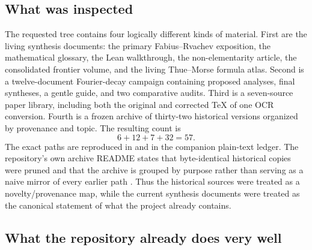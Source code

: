 \documentclass[11pt,oneside]{article}
\theoremstyle{definition}
\theoremstyle{remark}
\begin{document}
\subsection{What was inspected}

The requested tree contains four logically different kinds of material.
First are the living synthesis documents: the primary Fabius--Rvachev exposition, the
mathematical glossary, the Lean walkthrough, the non-elementarity article, the consolidated
frontier volume, and the living Thue--Morse formula atlas.  Second is a twelve-document
Fourier-decay campaign containing proposed analyses, final syntheses, a gentle guide, and two
comparative audits.  Third is a seven-source paper library, including both the original and
corrected TeX of one OCR conversion.  Fourth is a frozen archive of thirty-two historical
versions organized by provenance and topic.  The resulting count is
\[
 6+12+7+32=57.
\]
The exact paths are reproduced in  and in the companion plain-text
ledger.  The repository's own archive README states that byte-identical historical copies
were pruned and that the archive is grouped by purpose rather than serving as a naive mirror
of every earlier path \cite{proveitArchive}.  Thus the historical sources were treated as a
novelty/provenance map, while the current synthesis documents were treated as the canonical
statement of what the project already contains.

\subsection{What the repository already does very well}
\end{document}
